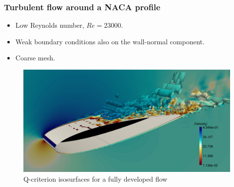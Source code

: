 \begin{frame}[t]
\frametitle{Turbulent flow around a NACA profile}
\begin{itemize}
\item Low Reynolds number, $ Re = 23000 $.
\item Weak boundary conditions \alert{also on the wall-normal component}.
\item Coarse mesh.
\end{itemize}
\begin{figure}[h]
  \centering
  \includegraphics[clip=true,trim=1cm 4cm 2cm 6cm,width=1.0\textwidth]{Figures/Q_criterion_3d}
  \caption{Q-criterion isosurfaces for a fully developed flow}
  \label{fig-TCF_isovorticity}
\end{figure}
\end{frame}